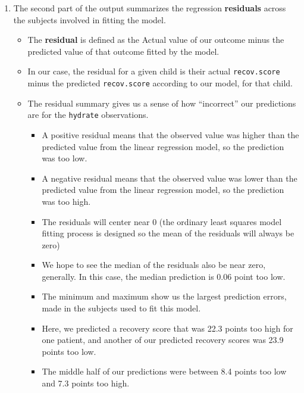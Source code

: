 \documentclass[
]{book}
\providecommand{\tightlist}{%
  \setlength{\itemsep}{0pt}\setlength{\parskip}{0pt}}
\begin{document}
\begin{enumerate}
\def\labelenumi{\arabic{enumi}.}
\setcounter{enumi}{1}
\tightlist
\item
  The second part of the output summarizes the regression \textbf{residuals} across the subjects involved in fitting the model.

  \begin{itemize}
  \tightlist
  \item
    The \textbf{residual} is defined as the Actual value of our outcome minus the predicted value of that outcome fitted by the model.
  \item
    In our case, the residual for a given child is their actual \texttt{recov.score} minus the predicted \texttt{recov.score} according to our model, for that child.
  \item
    The residual summary gives us a sense of how ``incorrect'' our predictions are for the \texttt{hydrate} observations.

    \begin{itemize}
    \tightlist
    \item
      A positive residual means that the observed value was higher than the predicted value from the linear regression model, so the prediction was too low.
    \item
      A negative residual means that the observed value was lower than the predicted value from the linear regression model, so the prediction was too high.
    \item
      The residuals will center near 0 (the ordinary least squares model fitting process is designed so the mean of the residuals will always be zero)
    \item
      We hope to see the median of the residuals also be near zero, generally. In this case, the median prediction is 0.06 point too low.
    \item
      The minimum and maximum show us the largest prediction errors, made in the subjects used to fit this model.
    \item
      Here, we predicted a recovery score that was 22.3 points too high for one patient, and another of our predicted recovery scores was 23.9 points too low.
    \item
      The middle half of our predictions were between 8.4 points too low and 7.3 points too high.
    \end{itemize}
  \end{itemize}
\end{enumerate}
\end{document}
